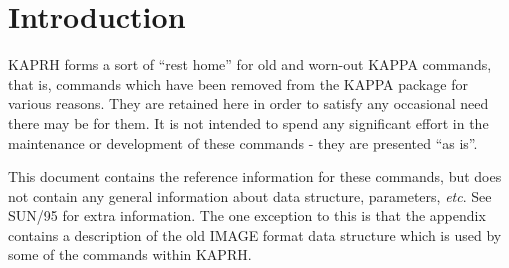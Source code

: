 \documentclass[twoside,11pt,nolof]{starlink}
\begin{document}
\scfrontmatter

\section{Introduction\label{se:kaprhintro}}

KAPRH forms a sort of ``rest home'' for old and worn-out KAPPA commands,
that is, commands which have been removed from the KAPPA package for
various reasons. They are retained here in order to satisfy
any occasional need there may be for them. It is not intended to spend
any significant effort in the maintenance or development of these
commands - they are presented ``as is''.

This document contains the reference information for these commands, but
does not contain any general information about data structure,
parameters, \emph{etc}. See SUN/95 for extra information. The one
exception to this is that the appendix contains a description of the
old IMAGE format data structure which is used by some of the commands within
KAPRH.

\newpage
\appendix
\end{document}
